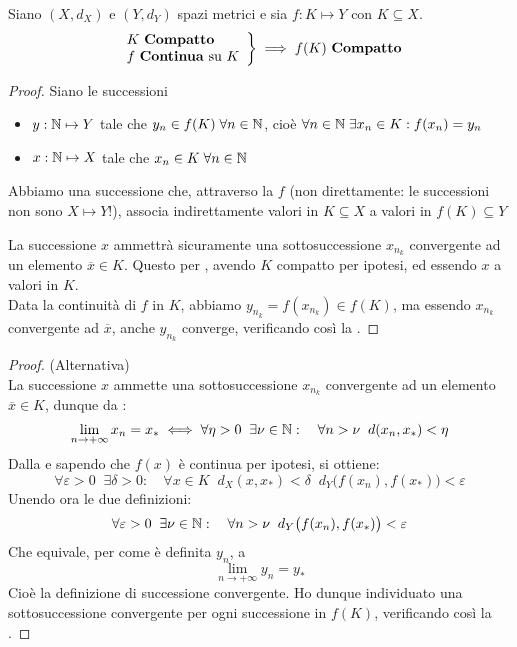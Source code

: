 \begin{theorem}
	\label{teo:weier_generale}
	Siano $(X,d_X)$ e $(Y,d_Y)$ spazi metrici e sia $f:K \mapsto Y$ con $K \subseteq X$.
	\begin{equation*}
		\left.
		\begin{array}{l}
		K \text{ \textbf{Compatto}} \\
		f \text{ \textbf{Continua} su } K
		\end{array}
		\right\} \implies
		f(K) \text{ \textbf{Compatto}}
	\end{equation*}
	\begin{proof}
		Siano le successioni
		\begin{itemize}
			\item $y: \mathbb{N} \mapsto Y$ tale che $y_n \in f(K) \;\forall n \in \mathbb{N}$, cioè $\forall n \in \mathbb{N}\;\exists x_n \in K: f(x_n) = y_n$
			\item $x: \mathbb{N} \mapsto X$ tale che $x_n \in K\;\forall n \in \mathbb{N}$
		\end{itemize}
		\begin{note}
			Abbiamo una successione che, attraverso la $f$ (non direttamente: le successioni non sono $X \mapsto Y$!), associa indirettamente valori in $K \subseteq X$ a valori in $f(K) \subseteq Y$
		\end{note}
		La successione $x$ ammettrà sicuramente una sottosuccessione $x_{n_k}$ convergente ad un elemento $\overline{x} \in K$. Questo per , avendo $K$ compatto per ipotesi, ed essendo $x$ a valori in $K$.\\
		Data la continuità di $f$ in $K$, abbiamo $y_{n_k} = f(x_{n_k}) \in f(K)$, ma essendo $x_{n_k}$ convergente ad $\overline{x}$, anche $y_{n_k}$ converge, verificando così la .
	\end{proof}
	\begin{proof} (Alternativa)\\
		La successione $x$ ammette una sottosuccessione $x_{n_k}$ convergente ad un elemento $\overline{x} \in K$, dunque da :
		$$\lim\limits_{n\rightarrow+\infty}x_n=x_*\iff\forall\eta > 0\;\;\exists\nu\in\mathbb{N}:\quad\forall n>\nu\;\;d(x_n,x_*)<\eta$$
		Dalla  e sapendo che $f(x)$ è continua per ipotesi, si ottiene:
		$$\forall\varepsilon > 0\;\;\exists\delta > 0:\quad\forall x \in K\;\;d_X (x,x_*)<\delta\;\;d_Y \bigl(f(x_n),f(x_*)\bigr)<\varepsilon$$
		Unendo ora le due definizioni:
		$$\forall \varepsilon > 0\;\;\exists \nu \in \mathbb{N}:\quad \forall n > \nu\;\;d_Y \bigl(f(x_n),f(x_*)\bigr)<\varepsilon$$
		Che equivale, per come è definita $y_n$, a
		$$\lim\limits_{n\rightarrow +\infty}y_n = y_*$$
		Cioè la definizione di successione convergente. Ho dunque individuato una sottosuccessione convergente per ogni successione in $f(K)$, verificando così la .
	\end{proof}
\end{theorem}
